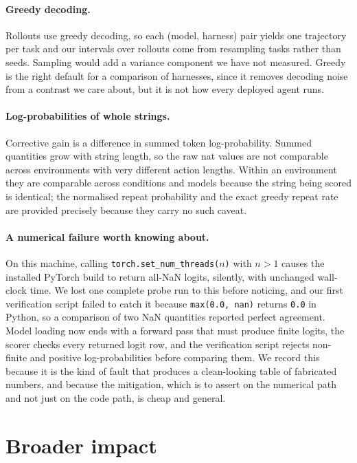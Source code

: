 \paragraph{Greedy decoding.}
Rollouts use greedy decoding, so each (model, harness) pair yields one
trajectory per task and our intervals over rollouts come from resampling tasks
rather than seeds. Sampling would add a variance component we have not measured.
Greedy is the right default for a comparison of harnesses, since it removes
decoding noise from a contrast we care about, but it is not how every deployed
agent runs.

\paragraph{Log-probabilities of whole strings.}
Corrective gain is a difference in summed token log-probability. Summed
quantities grow with string length, so the raw nat values are not comparable
across environments with very different action lengths. Within an environment
they are comparable across conditions and models because the string being scored
is identical; the normalised repeat probability and the exact greedy repeat rate
are provided precisely because they carry no such caveat.

\paragraph{A numerical failure worth knowing about.}
On this machine, calling \texttt{torch.set\_num\_threads($n$)} with $n > 1$
causes the installed PyTorch build to return all-NaN logits, silently, with
unchanged wall-clock time. We lost one complete probe run to this before
noticing, and our first verification script failed to catch it because
\texttt{max(0.0, nan)} returns \texttt{0.0} in Python, so a comparison of two
NaN quantities reported perfect agreement. Model loading now ends with a forward
pass that must produce finite logits, the scorer checks every returned logit
row, and the verification script rejects non-finite and positive
log-probabilities before comparing them. We record this because it is the kind
of fault that produces a clean-looking table of fabricated numbers, and because the mitigation, which is to assert on the numerical path and not
just on the code path, is cheap and general.

\section{Broader impact}

